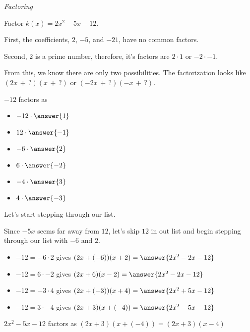 \documentclass{ximera}
\begin{document}
\begin{example} \textit{Factoring}

Factor $k(x) = 2 x^2 - 5 x - 12$.


\begin{explanation}

First, the coefficients, $2$, $-5$, and $-21$, have no common factors.


Second, $2$ is a prime number, therefore, it's factors are $2 \cdot 1$ or $-2 \cdot -1$.

From this, we know there are only two possibilities. The factorization looks like $(2 x \, + \, ?) (x \, + \, ?)$ or $(-2 x \, + \, ?) (-x \, + \, ?)$.






$-12$ factors as 
\begin{itemize}
\item $-12 \cdot \answer{1}$
\item $12 \cdot \answer{-1}$
\item $-6 \cdot \answer{2}$
\item $6 \cdot \answer{-2}$
\item $-4 \cdot \answer{3}$
\item $4 \cdot \answer{-3}$  
\end{itemize}



Let's start stepping through our list.

Since $-5 x$ seems far away from $12$, let's skip $12$ in out list and begin stepping through our list with $-6$ and $2$.

\begin{itemize}

\item $-12 = -6 \cdot 2$ gives $(2 x + (-6)) (x + 2) = \answer{2 x^2 - 2 x - 12}$
\item $-12 = 6 \cdot -2$ gives $(2 x + 6) (x - 2) = \answer{2 x^2 - 2 x -12}$
\item $-12 = -3 \cdot 4$ gives $(2 x + (-3)) (x + 4) = \answer{2 x^2 + 5 x - 12}$
\item $-12 = 3 \cdot -4$ gives $(2 x + 3) (x + (-4)) = \answer{2 x^2 - 5 x -12}$
\end{itemize}

$2 x^2 - 5 x - 12$ factors as $(2 x + 3) (x + (-4)) = (2 x + 3)(x - 4)$


\end{explanation}
\end{example}
\end{document}
